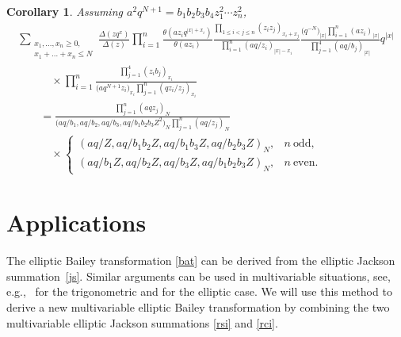 \documentclass[pdftex]{sigma}
\numberwithin{equation}{section}
\newtheorem{Corollary}[Theorem]{Corollary}
\begin{document}
\begin{Corollary}\label{rsc}
Assuming $a^2q^{N+1}=b_1b_2b_3b_4z_1^2\dotsm z_n^2$,
\begin{gather}\sum_{\substack{x_1,\dots,x_n\geq 0,\\x_1+\dots+x_n\leq N}}
\frac{\Delta(zq^x)}{\Delta(z)}\prod\limits_{i=1}^n\frac{\theta(az_iq^{|x|+x_i})}{\theta(az_i)}
\frac{\prod\limits_{1\leq i<j\leq n}(z_iz_j)_{x_i+x_j}}{\prod\limits_{i=1}^n(aq/z_i)_{|x|-x_i}}
\frac{\big(q^{-N}\big)_{|x|}\prod\limits_{i=1}^n(az_i)_{|x|}}{\prod\limits_{j=1}^4(aq/b_j)_{|x|}} q^{|x|}\nonumber\\
 \qquad\quad{} \times\prod\limits_{i=1}^n
\frac{\prod\limits_{j=1}^4(z_ib_j)_{x_i}}{\big(aq^{N+1}z_i\big)_{x_i}\prod\limits_{j=1}^n(qz_i/z_j)_{x_i}}\nonumber\\
\qquad{} =\frac{\prod\limits_{j=1}^n(aqz_j)_N}{\big(aq/b_1,aq/b_2,aq/b_3,aq/b_1b_2b_3Z^2\big)_N\prod\limits_{j=1}^n(aq/z_j)_N}\nonumber\\
\qquad\quad{} \times\begin{cases}(aq/Z,aq/b_1b_2Z,aq/b_1b_3Z,aq/b_2b_3Z)_N,& n~\text{odd},\\[4mm]
(aq/b_1Z,aq/b_2Z,aq/b_3Z,aq/b_1b_2b_3Z)_N,& n~\text{even}.
\end{cases}\label{rci}
\end{gather}
\end{Corollary}

\section{Applications}\label{ts}

The elliptic Bailey transformation \eqref{bat} can be derived from the elliptic Jackson summation~\eqref{js}. Similar arguments can be used
in multivariable situations, see, e.g.,~\cite{b,bs,mn} for the trigonometric and \cite{r} for the elliptic case.
We will use this method to derive a new multivariable elliptic Bailey transformation by combining the two
multivariable elliptic Jackson summations \eqref{rsi} and \eqref{rci}.
\end{document}
